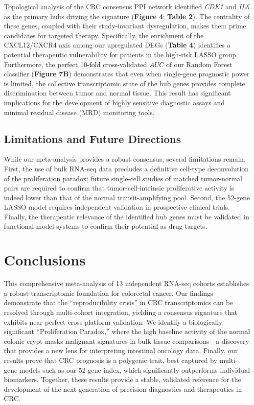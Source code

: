 \documentclass[
  12pt,
]{article}
\begin{document}
Topological analysis of the CRC consensus PPI network identified
\emph{CDK1} and \emph{IL6} as the primary hubs driving the signature
(\textbf{Figure 4}; \textbf{Table 2}). The centrality of these genes,
coupled with their study-invariant dysregulation, makes them prime
candidates for targeted therapy. Specifically, the enrichment of the
CXCL12/CXCR4 axis among our upregulated DEGs (\textbf{Table 4})
identifies a potential therapeutic vulnerability for patients in the
high-risk LASSO group. Furthermore, the perfect 10-fold cross-validated
\(AUC\) of our Random Forest classifier (\textbf{Figure 7B})
demonstrates that even when single-gene prognostic power is limited, the
collective transcriptomic state of the hub genes provides complete
discrimination between tumor and normal tissue. This result has
significant implications for the development of highly sensitive
diagnostic assays and minimal residual disease (MRD) monitoring tools.

\subsection{Limitations and Future
Directions}\label{limitations-and-future-directions}

While our meta-analysis provides a robust consensus, several limitations
remain. First, the use of bulk RNA-seq data precludes a definitive
cell-type deconvolution of the proliferation paradox; future single-cell
studies of matched tumor-normal pairs are required to confirm that
tumor-cell-intrinsic proliferative activity is indeed lower than that of
the normal transit-amplifying pool. Second, the 52-gene LASSO model
requires independent validation in prospective clinical trials. Finally,
the therapeutic relevance of the identified hub genes must be validated
in functional model systems to confirm their potential as drug targets.

\section{Conclusions}\label{conclusions}

This comprehensive meta-analysis of 13 independent RNA-seq cohorts
establishes a robust transcriptomic foundation for colorectal cancer.
Our findings demonstrate that the ``reproducibility crisis'' in CRC
transcriptomics can be resolved through multi-cohort integration,
yielding a consensus signature that exhibits near-perfect cross-platform
validation. We identify a biologically significant ``Proliferation
Paradox,'' where the high baseline activity of the normal colonic crypt
masks malignant signatures in bulk tissue comparisons---a discovery that
provides a new lens for interpreting intestinal oncology data. Finally,
our results prove that CRC prognosis is a polygenic trait, best captured
by multi-gene models such as our 52-gene index, which significantly
outperforms individual biomarkers. Together, these results provide a
stable, validated reference for the development of the next generation
of precision diagnostics and therapeutics in CRC.
\end{document}
